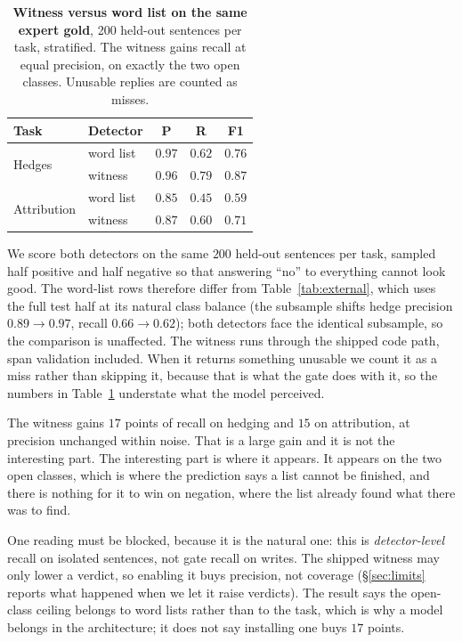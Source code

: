\documentclass[11pt]{article}
\begin{document}
\begin{table}[t]
\centering\small
\begin{tabular}{@{}llccc@{}}
\toprule
Task & Detector & P & R & F1 \\
\midrule
\multirow{2}{*}{Hedges} & word list & $0.97$ & $0.62$ & $0.76$ \\
 & witness & $0.96$ & $\mathbf{0.79}$ & $\mathbf{0.87}$ \\
\midrule
\multirow{2}{*}{Attribution} & word list & $0.85$ & $0.45$ & $0.59$ \\
 & witness & $0.87$ & $\mathbf{0.60}$ & $\mathbf{0.71}$ \\
\bottomrule
\end{tabular}
\caption{\textbf{Witness versus word list on the same expert gold}, 200 held-out
sentences per task, stratified. The witness gains recall at equal precision, on exactly
the two open classes. Unusable replies are counted as misses.}
\label{tab:witness}
\end{table}

We score both detectors on the same $200$ held-out sentences per task, sampled half
positive and half negative so that answering ``no'' to everything cannot look good. The
word-list rows therefore differ from Table~\ref{tab:external}, which uses the full test
half at its natural class balance (the subsample shifts hedge precision $0.89 \to 0.97$,
recall $0.66 \to 0.62$); both detectors face the identical subsample, so the comparison
is unaffected. The witness runs through the shipped code path, span validation included.
When it returns something unusable we count it as a miss rather than skipping it, because
that is what the gate does with it, so the numbers in Table~\ref{tab:witness} understate
what the model
perceived.

The witness gains $17$ points of recall on hedging and $15$ on attribution, at
precision unchanged within noise. That is a large gain and it is not the interesting part.
The interesting part is where it appears. It appears on the two open classes, which is
where the prediction says a list cannot be finished, and there is nothing for it to win on
negation, where the list already found what there was to find.

One reading must be blocked, because it is the natural one: this is
\emph{detector-level} recall on isolated sentences, not gate recall on writes. The
shipped witness may only lower a verdict, so enabling it buys precision, not coverage
(\S\ref{sec:limits} reports what happened when we let it raise verdicts). The result
says the open-class ceiling belongs to word lists rather than to the task, which is why
a model belongs in the architecture; it does not say installing one buys $17$ points.
\end{document}
